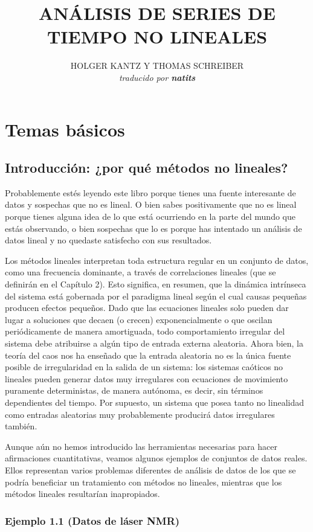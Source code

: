\documentclass[10pt,a4paper]{book}
\title{\textbf{ANÁLISIS DE SERIES DE TIEMPO NO LINEALES}}
\author{HOLGER KANTZ Y THOMAS SCHREIBER\\\textit{traducido por \textbf{natits}}}
\date{}
\begin{document}
\maketitle
\newpage
\tableofcontents
\newpage
\chapter{Temas básicos}
\section{Introducción: ¿por qué métodos no lineales?}
Probablemente estés leyendo este libro porque tienes una fuente interesante de datos y sospechas que no es lineal. O bien sabes positivamente que no es lineal porque tienes alguna idea de lo que está ocurriendo en la parte del mundo que estás observando, o bien sospechas que lo es porque has intentado un análisis de datos lineal y no quedaste satisfecho con sus resultados.

Los métodos lineales interpretan toda estructura regular en un conjunto de datos, como una frecuencia dominante, a través de correlaciones lineales (que se definirán en el Capítulo 2). Esto significa, en resumen, que la dinámica intrínseca del sistema está gobernada por el paradigma lineal según el cual causas pequeñas producen efectos pequeños. Dado que las ecuaciones lineales solo pueden dar lugar a soluciones que decaen (o crecen) exponencialmente o que oscilan periódicamente de manera amortiguada, todo comportamiento irregular del sistema debe atribuirse a algún tipo de entrada externa aleatoria. Ahora bien, la teoría del caos nos ha enseñado que la entrada aleatoria no es la única fuente posible de irregularidad en la salida de un sistema: los sistemas caóticos no lineales pueden generar datos muy irregulares con ecuaciones de movimiento puramente deterministas, de manera autónoma, es decir, sin términos dependientes del tiempo. Por supuesto, un sistema que posea tanto no linealidad como entradas aleatorias muy probablemente producirá datos irregulares también.

Aunque aún no hemos introducido las herramientas necesarias para hacer afirmaciones cuantitativas, veamos algunos ejemplos de conjuntos de datos reales. Ellos representan varios problemas diferentes de análisis de datos de los que se podría beneficiar un tratamiento con métodos no lineales, mientras que los métodos lineales resultarían inapropiados.

\subsection*{Ejemplo 1.1 (Datos de láser NMR)}
\end{document}
